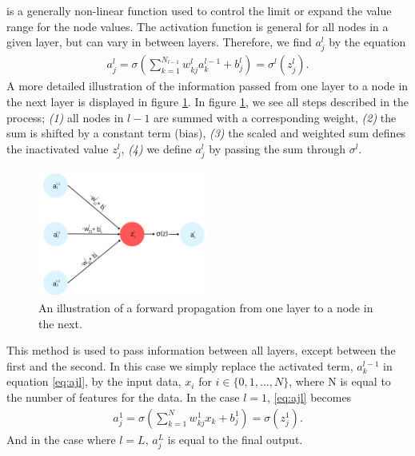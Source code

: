 is a generally non-linear function used to control the limit or expand the value range for the node values. The activation 
function is general for all nodes in a given layer, but can vary in between layers. Therefore,
we find $a_j^l$ by the equation
\begin{align}\label{eq:ajl}
    a_j^l = \sigma \left (\sum_{k=1} ^ {N_{l-1}} w_{kj}^la_k^{l-1} + b^l_j\right ) = \sigma^l(z_j^l).
\end{align}
A more detailed illustration of the information passed from one layer to a node in the next layer is displayed 
in figure \ref{fig:WB}. In figure \ref{fig:WB}, we see all steps described in the process; \emph{(1)} all nodes in 
$l-1$ are summed with a corresponding weight, \emph{(2)} the sum is shifted by a constant term (bias), \emph{(3)} the 
scaled and weighted sum defines the inactivated value $z_j^l$, \emph{(4)} we define $a^l_j$ by passing the 
sum through $\sigma^l$.  
\begin{figure}
    \centering
    \includegraphics[width=0.5\textwidth]{Figures/Illustrations/WeightBias.png}
    \caption{An illustration of a forward propagation from one layer to a node in the next.}
    \label{fig:WB}
\end{figure}
This method is used to pass information between all layers, except between the first and the second. 
In this case we simply replace the activated term, $a_k^{l-1}$ in equation \ref{eq:ajl}, by the input data,
$x_i$ for $i\in\{0,1,...,N\}$, where N is equal to the number of features for the data. In the case $l=1$, \ref{eq:ajl} 
becomes
\begin{align}
    a_j^1 = \sigma \left (\sum_{k=1} ^ {N} w_{kj}^1x_k + b^1_j\right ) = \sigma(z_j^1).
\end{align}
And in the case where $l=L$, $a_j^L$ is equal to the final output. 
